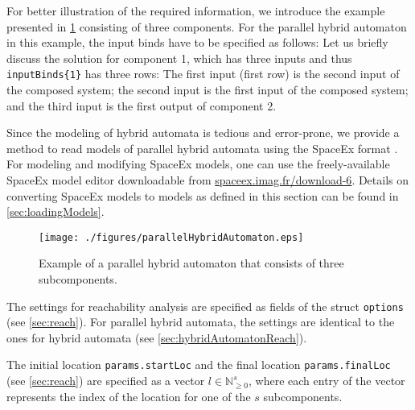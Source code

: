 For better illustration of the required information, we introduce the example presented in \cref{fig:parallelHybridAutomaton} consisting of three components. For the parallel hybrid automaton in this example, the input binds have to be specified as follows:
  {\small }
  Let us briefly discuss the solution for component 1, which has three inputs and thus \texttt{inputBinds\{1\}} has three rows: The first input (first row) is the second input of the composed system; the second input is the first input of the composed system; and the third input is the first output of component 2. 

Since the modeling of hybrid automata is tedious and error-prone, we provide a method to read models of parallel hybrid automata using the SpaceEx format \cite{Donze2013}. For modeling and modifying SpaceEx models, one can use the freely-available SpaceEx model editor downloadable from \href{http://spaceex.imag.fr/download-6}{spaceex.imag.fr/download-6}. Details on converting SpaceEx models to models as defined in this section can be found in \cref{sec:loadingModels}.


\begin{figure}[htb]
  \centering	
    \texttt{[image: ./figures/parallelHybridAutomaton.eps]}
    \caption{Example of a parallel hybrid automaton that consists of three subcomponents.}
    \label{fig:parallelHybridAutomaton}		
\end{figure}




The settings for reachability analysis are specified as fields of the struct \texttt{options} (see \cref{sec:reach}). For parallel hybrid automata, the settings are identical to the ones for hybrid automata (see \cref{sec:hybridAutomatonReach}).

The initial location \texttt{params.startLoc} and the final location \texttt{params.finalLoc} (see \cref{sec:reach}) are specified as a vector $l \in \mathbb{N}_{\geq 0}^s$, where each entry of the vector represents the index of the location for one of the $s$ subcomponents.

